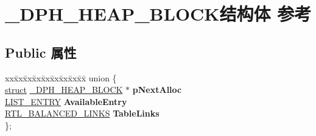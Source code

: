 \hypertarget{struct___d_p_h___h_e_a_p___b_l_o_c_k}{}\section{\+\_\+\+D\+P\+H\+\_\+\+H\+E\+A\+P\+\_\+\+B\+L\+O\+C\+K结构体 参考}
\label{struct___d_p_h___h_e_a_p___b_l_o_c_k}
\subsection*{Public 属性}
\begin{DoxyCompactItemize}
\item 
\mbox{\label{struct___d_p_h___h_e_a_p___b_l_o_c_k_a4a615433a76155213351ace253856041}} 
\begin{tabbing}
xx\=xx\=xx\=xx\=xx\=xx\=xx\=xx\=xx\=\kill
union \{\\
\>\hyperlink{interfacestruct}{struct} \hyperlink{struct___d_p_h___h_e_a_p___b_l_o_c_k}{\_DPH\_HEAP\_BLOCK} $\ast$ {\bfseries pNextAlloc}\\
\>\hyperlink{struct___l_i_s_t___e_n_t_r_y}{LIST\_ENTRY} {\bfseries AvailableEntry}\\
\>\hyperlink{struct___r_t_l___b_a_l_a_n_c_e_d___l_i_n_k_s}{RTL\_BALANCED\_LINKS} {\bfseries TableLinks}\\
\}; \\


\end{tabbing}
\end{DoxyCompactItemize}
